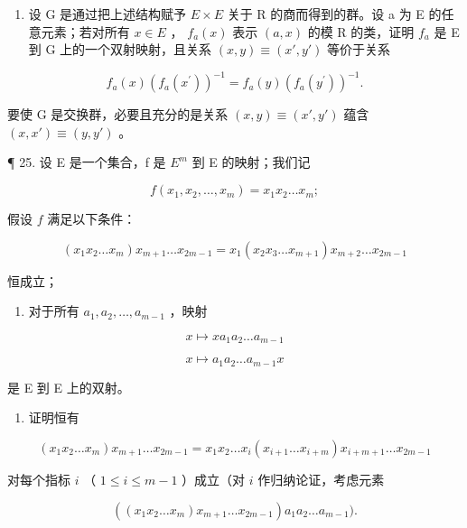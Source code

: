 \begin{enumerate}
\def\labelenumi{(\alph{enumi})}
\setcounter{enumi}{2}
\tightlist
\item
  设 G 是通过把上述结构赋予 \(E \times E\) 关于 R 的商而得到的群。设 a 为 E 的任意元素；若对所有 \(x \in E\) ， \(f_{a}(x)\) 表示 \((a, x)\) 的模 R 的类，证明 \(f_{a}\) 是 E 到 G 上的一个双射映射，且关系 \((x, y) \equiv (x', y')\) 等价于关系
\end{enumerate}

\[
f _ {a} (x) \left(f _ {a} \left(x ^ {\prime}\right)\right) ^ {- 1} = f _ {a} (y) \left(f _ {a} \left(y ^ {\prime}\right)\right) ^ {- 1}.
\]

要使 G 是交换群，必要且充分的是关系 \((x,y)\equiv (x',y')\) 蕴含 \((x,x')\equiv (y,y')\) 。

¶ 25. 设 E 是一个集合，f 是 \(E^{m}\) 到 E 的映射；我们记

\[
f (x _ {1}, x _ {2}, \dots , x _ {m}) = x _ {1} x _ {2} \dots x _ {m};
\]

假设 \(f\) 满足以下条件：

\[
(x _ {1} x _ {2} \dots x _ {m}) x _ {m + 1} \dots x _ {2 m - 1} = x _ {1} (x _ {2} x _ {3} \dots x _ {m + 1}) x _ {m + 2} \dots x _ {2 m - 1}\tag{1}
\]

恒成立；

\begin{enumerate}
\def\labelenumi{(\arabic{enumi})}
\setcounter{enumi}{1}
\tightlist
\item
  对于所有 \(a_1, a_2, \ldots, a_{m-1}\) ，映射
\end{enumerate}

\[
x \mapsto x a _ {1} a _ {2} \dots a _ {m - 1}
\]

\[
x \mapsto a _ {1} a _ {2} \dots a _ {m - 1} x
\]

是 E 到 E 上的双射。

\begin{enumerate}
\def\labelenumi{(\alph{enumi})}
\tightlist
\item
  证明恒有
\end{enumerate}

\[
(x _ {1} x _ {2} \dots x _ {m}) x _ {m + 1} \dots x _ {2 m - 1} = x _ {1} x _ {2} \dots x _ {i} (x _ {i + 1} \dots x _ {i + m}) x _ {i + m + 1} \dots x _ {2 m - 1}
\]

对每个指标 \(i\) （ \(1 \leqslant i \leqslant m - 1\) ）成立（对 \(i\) 作归纳论证，考虑元素

\[
\left(\left(x _ {1} x _ {2} \dots x _ {m}\right) x _ {m + 1} \dots x _ {2 m - 1}\right) a _ {1} a _ {2} \dots a _ {m - 1}).
\]

